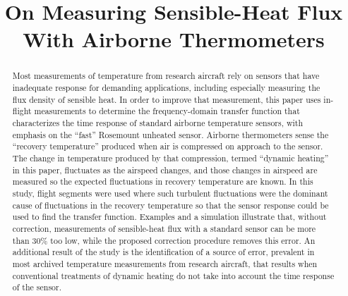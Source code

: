 \documentclass[amt, manuscript]{copernicus}
\begin{document}
\title{On Measuring Sensible-Heat Flux With Airborne Thermometers}











\received{}
\pubdiscuss{} %
\revised{}
\accepted{}
\published{}




\maketitle


\begin{abstract}
Most measurements of temperature from research aircraft rely on sensors
that have inadequate response for demanding applications, including
especially measuring the flux density of sensible heat. In order to
improve that measurement, this paper uses in-flight measurements to
determine the frequency-domain transfer function that characterizes the
time response of standard airborne temperature sensors, with emphasis on
the ``fast'' Rosemount unheated sensor. Airborne thermometers sense the
``recovery temperature'' produced when air is compressed on approach to
the sensor. The change in temperature produced by that compression,
termed ``dynamic heating'' in this paper, fluctuates as the airspeed
changes, and those changes in airspeed are measured so the expected
fluctuations in recovery temperature are known. In this study, flight
segments were used where such turbulent fluctuations were the dominant
cause of fluctuations in the recovery temperature so that the sensor
response could be used to find the transfer function. Examples and a
simulation illustrate that, without correction, measurements of
sensible-heat flux with a standard sensor can be more than 30\% too low,
while the proposed correction procedure removes this error. An
additional result of the study is the identification of a source of
error, prevalent in most archived temperature measurements from research
aircraft, that results when conventional treatments of dynamic heating
do not take into account the time response of the sensor.
\end{abstract}
\end{document}
